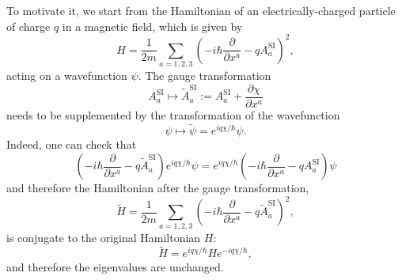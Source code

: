 \documentclass[12pt]{article}
\numberwithin{equation}{section}
\numberwithin{figure}{section}
\theoremstyle{remark}
\begin{document}
To motivate it, we start from the Hamiltonian of an electrically-charged particle of charge $q$ in a magnetic field, which is given by \begin{equation}
H = \frac{1}{2m} \sum_{a=1,2,3}\left( -i\hbar\frac{\partial}{\partial x^a} - q A^\text{SI}_a \right)^2 ,
\end{equation}
acting on a wavefunction $\psi$. 
The gauge transformation \begin{equation}
A^\text{SI}_a \mapsto \tilde A^\text{SI}_a:=A^\text{SI}_a + \frac{\partial \chi}{\partial x^a}
\end{equation} needs to be supplemented by the transformation of the wavefunction \begin{equation}
\psi \mapsto \tilde \psi = e^{iq\chi/\hbar} \psi. \label{eq:gauge-tr}
\end{equation}
Indeed, one can check that \begin{equation}
  \left( -i\hbar\frac{\partial}{\partial x^a} - q \tilde A^\text{SI}_a \right) 
  e^{iq\chi/\hbar}\psi=
  e^{iq\chi/\hbar} \left( -i\hbar\frac{\partial}{\partial x^a} - q A^\text{SI}_a \right) \psi
\end{equation}
and therefore the Hamiltonian after the gauge transformation, \begin{equation}
\tilde H= \frac{1}{2m} \sum_{a=1,2,3}\left( -i\hbar\frac{\partial}{\partial x^a} - q \tilde A^\text{SI}_a \right)^2,
\end{equation} is conjugate to the original Hamiltonian $H$: \begin{equation}
\tilde H = e^{iq\chi/\hbar} H e^{-iq\chi/\hbar},
\end{equation} and therefore the eigenvalues are unchanged. 
\end{document}
